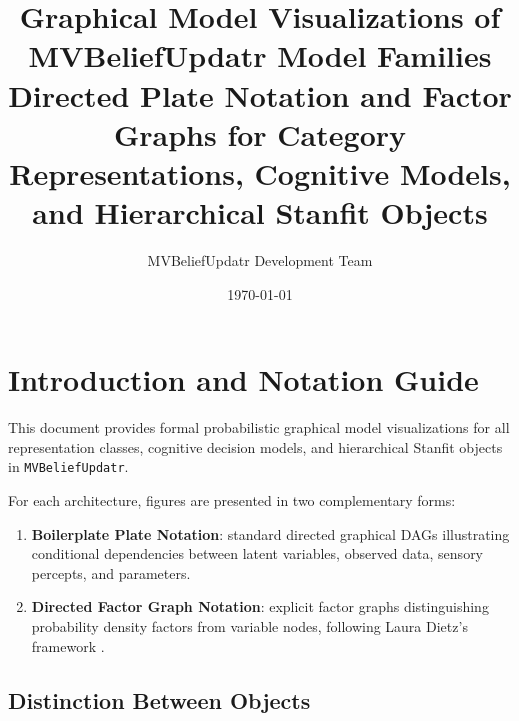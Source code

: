 \documentclass[11pt]{report}
\title{\textbf{Graphical Model Visualizations of MVBeliefUpdatr Model Families}\\
\large Directed Plate Notation and Factor Graphs for Category Representations, Cognitive Models, and Hierarchical Stanfit Objects}
\author{MVBeliefUpdatr Development Team}
\date{\today}
\begin{document}
\maketitle
\tableofcontents
\newpage

\chapter{Introduction and Notation Guide}

This document provides formal probabilistic graphical model visualizations for all representation classes, cognitive decision models, and hierarchical Stanfit objects in \texttt{MVBeliefUpdatr}.

For each architecture, figures are presented in two complementary forms:
\begin{enumerate}
  \item \textbf{Boilerplate Plate Notation}: standard directed graphical DAGs illustrating conditional dependencies between latent variables, observed data, sensory percepts, and parameters.
  \item \textbf{Directed Factor Graph Notation}: explicit factor graphs distinguishing probability density factors from variable nodes, following Laura Dietz's framework \cite{Dietz:2010}.
\end{enumerate}

\section{Distinction Between Objects}
\end{document}

